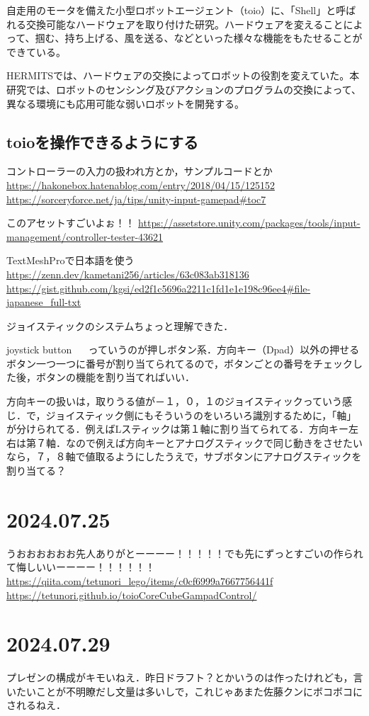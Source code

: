 \documentclass[twocolumn]{mynote}
\begin{document}
自走用のモータを備えた小型ロボットエージェント（toio）に、「Shell」と呼ばれる交換可能なハードウェアを取り付けた研究。ハードウェアを変えることによって、掴む、持ち上げる、風を送る、などといった様々な機能をもたせることができている。

HERMITSでは、ハードウェアの交換によってロボットの役割を変えていた。本研究では、ロボットのセンシング及びアクションのプログラムの交換によって、異なる環境にも応用可能な弱いロボットを開発する。

\subsection{toioを操作できるようにする}
コントローラーの入力の扱われ方とか，サンプルコードとか
\url{https://hakonebox.hatenablog.com/entry/2018/04/15/125152}
\url{https://sorceryforce.net/ja/tips/unity-input-gamepad#toc7}

このアセットすごいよぉ！！
\url{https://assetstore.unity.com/packages/tools/input-management/controller-tester-43621}

TextMeshProで日本語を使う
\url{https://zenn.dev/kametani256/articles/63c083ab318136}
\url{https://gist.github.com/kgsi/ed2f1c5696a2211c1fd1e1e198c96ee4#file-japanese_full-txt}

ジョイスティックのシステムちょっと理解できた．

joystick button ~~ っていうのが押しボタン系．方向キー（Dpad）以外の押せるボタン一つ一つに番号が割り当てられてるので，ボタンごとの番号をチェックした後，ボタンの機能を割り当てればいい．

方向キーの扱いは，取りうる値が－１，０，１のジョイスティックっていう感じ．で，ジョイスティック側にもそういうのをいろいろ識別するために，「軸」が分けられてる．例えばLスティックは第１軸に割り当てられてる．方向キー左右は第７軸．なので例えば方向キーとアナログスティックで同じ動きをさせたいなら，７，８軸で値取るようにしたうえで，サブボタンにアナログスティックを割り当てる？

\section*{2024.07.25}
うおおおおおお先人ありがとーーーー！！！！！でも先にずっとすごいの作られて悔しいいーーーー！！！！！！
\url{https://qiita.com/tetunori_lego/items/c0cf6999a7667756441f}
\url{https://tetunori.github.io/toioCoreCubeGampadControl/}

\section*{2024.07.29}
プレゼンの構成がキモいねえ．昨日ドラフト？とかいうのは作ったけれども，言いたいことが不明瞭だし文量は多いしで，これじゃあまた佐藤クンにボコボコにされるねえ．
\end{document}
